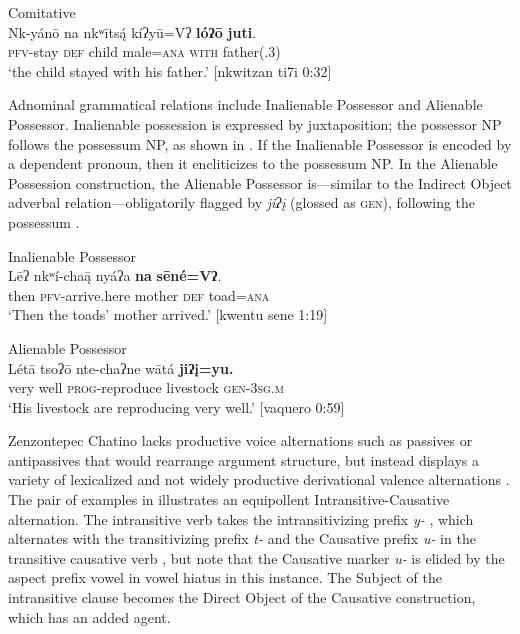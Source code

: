 \documentclass[output=paper]{../langscibook}
\begin{document}
\ea\label{ex:campbell:14}
{Comitative}\\
\gll Nk-yánō  na  nkʷīts\'{ą}  kíʔyū=Vʔ  \textbf{lóʔō}  \textbf{juti}.\\
     \textsc{pfv-}stay  \textsc{def}  child  male=\textsc{ana}  \textsc{with}  father(.3)\\
\glt ‘the child stayed with his father.’ [nkwitzan ti7i 0:32]
\z


Adnominal grammatical relations include Inalienable Possessor and Alienable Possessor. Inalienable possession is expressed by juxtaposition; the possessor NP follows the possessum NP, as shown in . If the Inalienable Possessor is encoded by a dependent pronoun, then it encliticizes to the possessum NP. In the Alienable Possession construction, the Alienable Possessor is—similar to the Indirect Object adverbal relation—obligatorily flagged by \textit{jiʔį} (glossed as \textsc{gen}), following the possessum .


\ea\label{ex:campbell:15}
{Inalienable Possessor}\\
\gll Lēʔ  nkʷí-cha\={ą}  nyáʔa  \textbf{na}  \textbf{sēné=Vʔ}.\\
     then  \textsc{pfv}{}-arrive.here  mother  \textsc{def}  toad\textsc{=ana}\\
\glt ‘Then the toads’ mother arrived.’ [kwentu sene 1:19]
\z

\ea\label{ex:campbell:16}
{Alienable Possessor}\\
\gll Létā  tsoʔō  nte-chaʔne  wātá  \textbf{jiʔį=yu.}\\
     very  well  \textsc{prog-}reproduce  livestock  \textsc{gen-3sg.m}\\
\glt ‘His livestock are reproducing very well.’ [vaquero 0:59]
\z


Zenzontepec Chatino lacks productive voice alternations such as passives or antipassives that would rearrange argument structure, but instead displays a variety of lexicalized and not widely productive derivational valence alternations \citep{Campbell2015}. The pair of examples in  illustrates an equipollent Intransitive-Causative alternation. The intransitive verb takes the intransitivizing prefix \textit{y-} , which alternates with the transitivizing prefix \textit{t-} and the Causative prefix \textit{u-} in the transitive causative verb , but note that the Causative marker \textit{u-} is elided by the aspect prefix vowel in vowel hiatus in this instance. The Subject of the intransitive clause becomes the Direct Object of the Causative construction, which has an added agent.
\end{document}
